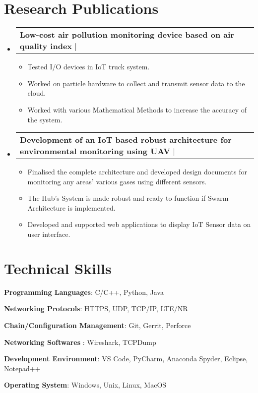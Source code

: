 \documentclass[letterpaper,11pt]{article}
\makeatletter
\newcommand{\resumeItem}[1]{
  \item\small{
    {#1 \vspace{-2pt}}
  }
}
\newcommand{\resumeProjectHeading}[2]{
    \item
    \begin{tabular*}{1.001\textwidth}{l@{\extracolsep{\fill}}r}
      \small#1 & \textbf{\small }\\
    \end{tabular*}\vspace{-7pt}
}
\newcommand{\resumeSubHeadingListStart}{\begin{itemize}[leftmargin=0.0in, label={}]}
\newcommand{\resumeSubHeadingListEnd}{\end{itemize}}
\newcommand{\resumeItemListStart}{\begin{itemize}}
\newcommand{\resumeItemListEnd}{\end{itemize}\vspace{-5pt}}
\makeatother
\begin{document}
\section{Research Publications}
    \vspace{-5pt}
    \resumeSubHeadingListStart
    \resumeProjectHeading
    {\textbf{Low-cost air pollution monitoring device based on air quality index} $|$ {\href{https://papers.ssrn.com/sol3/papers.cfm?abstract_id=3515043}{\faIcon{link}{ Link}}}}{}%
          \resumeItemListStart
            \resumeItem{Tested I/O devices in IoT truck system.}
            \resumeItem{Worked on particle hardware to collect and transmit sensor data to the cloud.}
            \resumeItem{Worked with various Mathematical Methods to increase the accuracy of the system.}
          \resumeItemListEnd
    \vspace{-13pt}
      \resumeProjectHeading
          {\textbf{Development of an IoT based robust architecture for environmental monitoring using UAV} $|$ {\href{https://ieeexplore.ieee.org/document/9028987}{\faIcon{link}{ Link}}}}{}
          \resumeItemListStart
            \resumeItem{Finalised the complete architecture and developed design documents for monitoring any areas' various gases using different sensors.}
            \resumeItem{The Hub's System is made robust and ready to function if Swarm Architecture is implemented.}
            \resumeItem{Developed and supported web applications to display IoT Sensor data on user interface.}
          \resumeItemListEnd
    \resumeSubHeadingListEnd
\vspace{-15pt}

\smallskip
\section{Technical Skills}
\begin{multicols}{2}
 \begin{itemize}[leftmargin=0.15in, label={}]
    \small{\item{
     \textbf{Programming Languages}{: C/C++, Python, Java} \\
    \smallskip
    
     \textbf{Networking Protocols}{: HTTPS, UDP, TCP/IP, LTE/NR} \\
     \smallskip
     
     \textbf{Chain/Configuration Management}{: Git, Gerrit, Perforce } \\
     \smallskip

     \textbf{Networking Softwares }{: Wireshark, TCPDump } \\
     \smallskip
     
     \textbf{Development Environment}{: VS Code, PyCharm, Anaconda Spyder, Eclipse, Notepad++} \\
     \smallskip
     
     \textbf{Operating System}{: Windows, Unix, Linux, MacOS} \\
    }}
 \end{itemize}
  \end{multicols}
 \vspace{-3.5pt}
\end{document}
